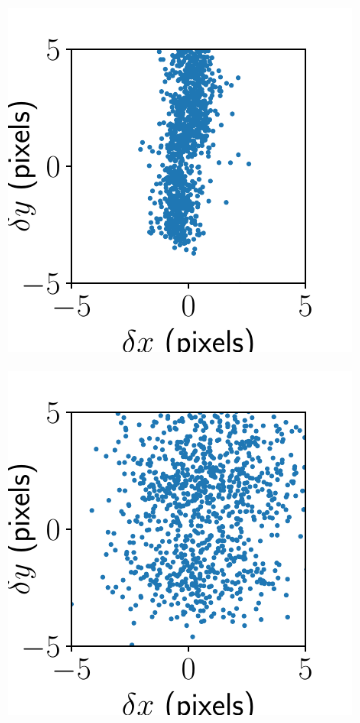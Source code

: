 \documentclass{article}
\begin{document}
\begin{figure}[ht]
\begin{subfigure}{0.24\linewidth}
		\caption{}
		\label{fig:alignmentresultbig3}
	\end{subfigure}
	\begin{subfigure}{0.24\linewidth}
		\includegraphics[width=\linewidth]{alignment-result-vectra-big-2.pdf}
		\caption{}
		\label{fig:alignmentresultbig2}
	\end{subfigure}
	\begin{subfigure}{0.24\linewidth}
		\includegraphics[width=\linewidth]{alignment-result-vectra-big-1.pdf}

\end{subfigure}
\end{figure}
\end{document}
